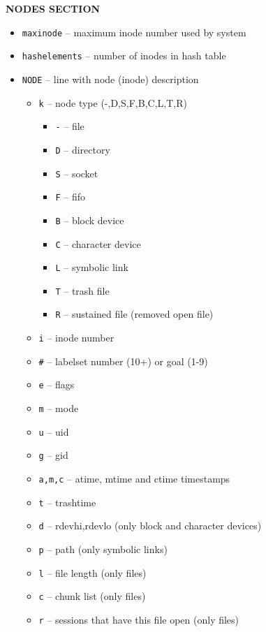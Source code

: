 \documentclass[a4paper,11pt,english]{report}
\def\code#1{\texttt{#1}}
\begin{document}
				\textbf{NODES SECTION}
				\begin{itemize}
					\item \code{maxinode}            -- maximum inode number used by system
					\item \code{hashelements}        -- number of inodes in hash table
					\item \code{NODE}      -- line with node (inode) description
					\begin{itemize}
						\item \code{k}      -- node type (-,D,S,F,B,C,L,T,R)
						\begin{itemize}
							\item \code{-}      -- file
							\item \code{D}      -- directory
							\item \code{S}      -- socket
							\item \code{F}      -- fifo
							\item \code{B}      -- block device
							\item \code{C}      -- character device
							\item \code{L}      -- symbolic link
							\item \code{T}      -- trash file
							\item \code{R}      -- sustained file (removed open file)
						\end{itemize}
						\item \code{i}      -- inode number
						\item \code{\#}      -- labelset number (10+) or goal (1-9)
						\item \code{e}      -- flags
						\item \code{m}      -- mode
						\item \code{u}      -- uid
						\item \code{g}      -- gid
						\item \code{a,m,c}  -- atime, mtime and ctime timestamps
						\item \code{t}      -- trashtime
						\item \code{d}      -- rdevhi,rdevlo (only block and character devices)
						\item \code{p}      -- path (only symbolic links)
						\item \code{l}      -- file length (only files)
						\item \code{c}      -- chunk list (only files)
						\item \code{r}      -- sessions that have this file open (only files)
					\end{itemize}
				\end{itemize}
				\bigskip
				
\end{document}
